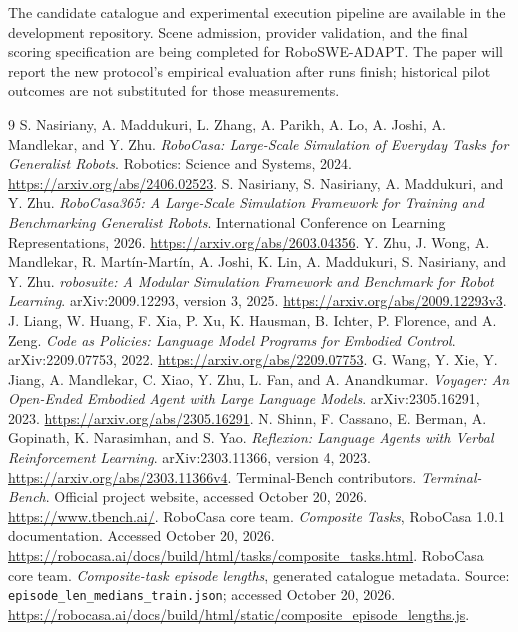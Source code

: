 \documentclass[11pt]{article}
\begin{document}
The candidate catalogue and experimental execution pipeline are available in the development repository. Scene admission, provider validation, and the final scoring specification are being completed for RoboSWE-ADAPT. The paper will report the new protocol's empirical evaluation after runs finish; historical pilot outcomes are not substituted for those measurements.

\begin{thebibliography}{9}
 S. Nasiriany, A. Maddukuri, L. Zhang, A. Parikh, A. Lo, A. Joshi, A. Mandlekar, and Y. Zhu. \emph{RoboCasa: Large-Scale Simulation of Everyday Tasks for Generalist Robots}. Robotics: Science and Systems, 2024. \url{https://arxiv.org/abs/2406.02523}.
 S. Nasiriany, S. Nasiriany, A. Maddukuri, and Y. Zhu. \emph{RoboCasa365: A Large-Scale Simulation Framework for Training and Benchmarking Generalist Robots}. International Conference on Learning Representations, 2026. \url{https://arxiv.org/abs/2603.04356}.
 Y. Zhu, J. Wong, A. Mandlekar, R. Mart\'in-Mart\'in, A. Joshi, K. Lin, A. Maddukuri, S. Nasiriany, and Y. Zhu. \emph{robosuite: A Modular Simulation Framework and Benchmark for Robot Learning}. arXiv:2009.12293, version 3, 2025. \url{https://arxiv.org/abs/2009.12293v3}.
 J. Liang, W. Huang, F. Xia, P. Xu, K. Hausman, B. Ichter, P. Florence, and A. Zeng. \emph{Code as Policies: Language Model Programs for Embodied Control}. arXiv:2209.07753, 2022. \url{https://arxiv.org/abs/2209.07753}.
 G. Wang, Y. Xie, Y. Jiang, A. Mandlekar, C. Xiao, Y. Zhu, L. Fan, and A. Anandkumar. \emph{Voyager: An Open-Ended Embodied Agent with Large Language Models}. arXiv:2305.16291, 2023. \url{https://arxiv.org/abs/2305.16291}.
 N. Shinn, F. Cassano, E. Berman, A. Gopinath, K. Narasimhan, and S. Yao. \emph{Reflexion: Language Agents with Verbal Reinforcement Learning}. arXiv:2303.11366, version 4, 2023. \url{https://arxiv.org/abs/2303.11366v4}.
 Terminal-Bench contributors. \emph{Terminal-Bench}. Official project website, accessed October 20, 2026. \url{https://www.tbench.ai/}.
 RoboCasa core team. \emph{Composite Tasks}, RoboCasa 1.0.1 documentation. Accessed October 20, 2026. \url{https://robocasa.ai/docs/build/html/tasks/composite_tasks.html}.
 RoboCasa core team. \emph{Composite-task episode lengths}, generated catalogue metadata. Source: \texttt{episode\_len\_medians\_train.json}; accessed October 20, 2026. \url{https://robocasa.ai/docs/build/html/static/composite_episode_lengths.js}.
\end{thebibliography}
\end{document}
